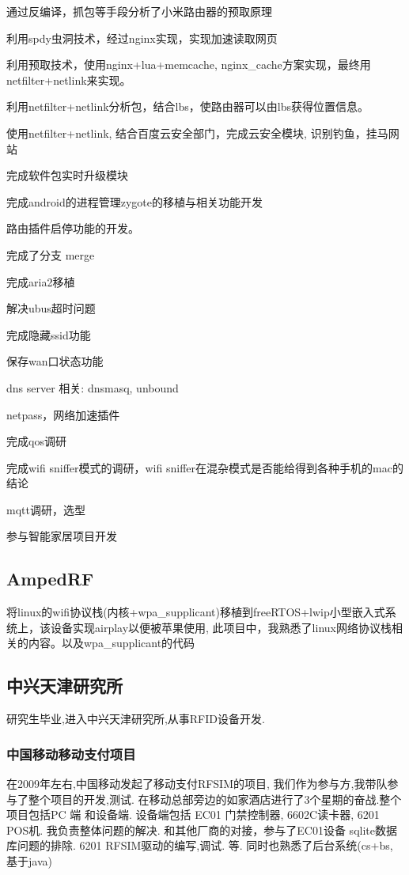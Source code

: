 \documentclass[titlepage]{article}
\begin{document}
\begin{compactitem}
    \item 通过反编译，抓包等手段分析了小米路由器的预取原理
    \item 利用spdy虫洞技术，经过nginx实现，实现加速读取网页
    \item 利用预取技术，使用nginx+lua+memcache, nginx\_cache方案实现，最终用netfilter+netlink来实现。
    \item 利用netfilter+netlink分析包，结合lbs，使路由器可以由lbs获得位置信息。
    \item 使用netfilter+netlink, 结合百度云安全部门，完成云安全模块, 识别钓鱼，挂马网站
    \item 完成软件包实时升级模块
    \item 完成android的进程管理zygote的移植与相关功能开发
    \item 路由插件启停功能的开发。
    \item 完成了分支 merge
    \item 完成aria2移植
    \item 解决ubus超时问题
    \item 完成隐藏ssid功能
    \item 保存wan口状态功能
    \item dns server 相关: dnsmasq, unbound
    \item netpass，网络加速插件
    \item 完成qos调研
    \item 完成wifi sniffer模式的调研，wifi sniffer在混杂模式是否能给得到各种手机的mac的结论
    \item mqtt调研，选型
\end{compactitem}

参与智能家居项目开发

\subsection{AmpedRF}

将linux的wifi协议栈(内核+wpa\_supplicant)移植到freeRTOS+lwip小型嵌入式系统上，该设备实现airplay以便被苹果使用, 此项目中，我熟悉了linux网络协议栈相关的内容。以及wpa\_supplicant的代码

\subsection{中兴天津研究所}

研究生毕业,进入中兴天津研究所,从事RFID设备开发.

\subsubsection{中国移动移动支付项目}
在2009年左右,中国移动发起了移动支付RFSIM的项目, 我们作为参与方,我带队参与了整个项目的开发,测试. 在移动总部旁边的如家酒店进行了3个星期的奋战.整个项目包括PC 端 和设备端. 设备端包括 EC01 门禁控制器, 6602C读卡器, 6201 POS机. 我负责整体问题的解决. 和其他厂商的对接，参与了EC01设备 sqlite数据库问题的排除. 6201 RFSIM驱动的编写,调试. 等. 同时也熟悉了后台系统(cs+bs, 基于java)
\end{document}
